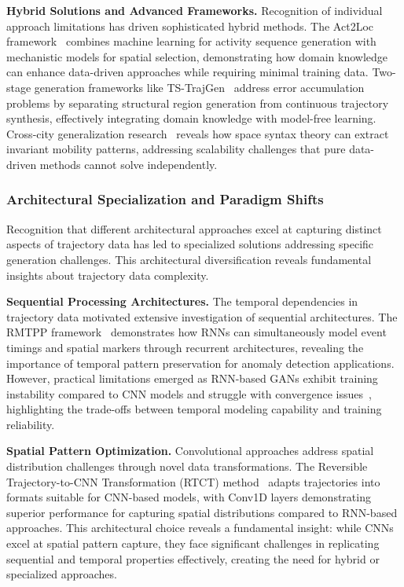\documentclass[runningheads]{llncs}
\begin{document}
\textbf{Hybrid Solutions and Advanced Frameworks.} Recognition of individual approach limitations has driven sophisticated hybrid methods. The Act2Loc framework~\cite{liu2023act2loc} combines machine learning for activity sequence generation with mechanistic models for spatial selection, demonstrating how domain knowledge can enhance data-driven approaches while requiring minimal training data. Two-stage generation frameworks like TS-TrajGen~\cite{jiang2023continuous} address error accumulation problems by separating structural region generation from continuous trajectory synthesis, effectively integrating domain knowledge with model-free learning. Cross-city generalization research~\cite{wang2025gtg} reveals how space syntax theory can extract invariant mobility patterns, addressing scalability challenges that pure data-driven methods cannot solve independently.

\subsubsection{Architectural Specialization and Paradigm Shifts}

Recognition that different architectural approaches excel at capturing distinct aspects of trajectory data has led to specialized solutions addressing specific generation challenges. This architectural diversification reveals fundamental insights about trajectory data complexity.

\textbf{Sequential Processing Architectures.} The temporal dependencies in trajectory data motivated extensive investigation of sequential architectures. The RMTPP framework~\cite{du2016recurrent} demonstrates how RNNs can simultaneously model event timings and spatial markers through recurrent architectures, revealing the importance of temporal pattern preservation for anomaly detection applications. However, practical limitations emerged as RNN-based GANs exhibit training instability compared to CNN models and struggle with convergence issues~\cite{merhi2024synthetic}, highlighting the trade-offs between temporal modeling capability and training reliability.

\textbf{Spatial Pattern Optimization.} Convolutional approaches address spatial distribution challenges through novel data transformations. The Reversible Trajectory-to-CNN Transformation (RTCT) method~\cite{merhi2024synthetic} adapts trajectories into formats suitable for CNN-based models, with Conv1D layers demonstrating superior performance for capturing spatial distributions compared to RNN-based approaches. This architectural choice reveals a fundamental insight: while CNNs excel at spatial pattern capture, they face significant challenges in replicating sequential and temporal properties effectively, creating the need for hybrid or specialized approaches.
\end{document}

